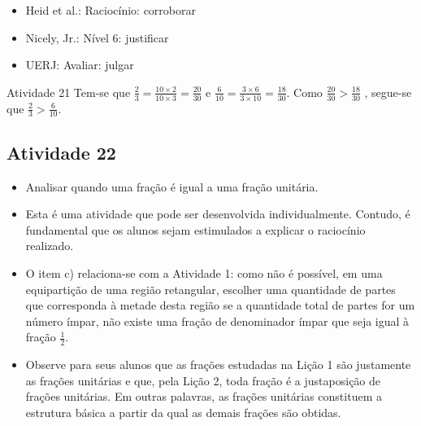    \vspace{.1cm}

 \vspace{.1cm}

\begin{itemize} %
    \item       Heid et al.: Raciocínio: corroborar
    \item       Nicely, Jr.: Nível 6: justificar
    \item       UERJ: Avaliar: julgar
\end{itemize} %

\begin{resposta*}{Atividade 21}
  Tem-se que   $\frac{2}{3} = \frac{10 \times 2}{10 \times 3} = \frac{20}{30}$
e
  $\frac{6}{10} = \frac{3 \times 6}{3 \times 10} = \frac{18}{30}$.
  Como   $\frac{20}{30} > \frac{18}{30}$  , segue-se que   $\frac{2}{3} >
\frac{6}{10}$.
\end{resposta*}

\subsection{Atividade 22}

\begin{itemize} %
    \item       Analisar quando uma fração é igual a uma fração unitária.
\end{itemize} %



\begin{itemize} %
    \item       Esta é uma atividade que pode ser desenvolvida individualmente.
Contudo, é fundamental que os alunos sejam estimulados a explicar o raciocínio
realizado.
    \item       O item c) relaciona-se com a Atividade 1: como não é possível,
em uma equipartição de uma região retangular, escolher uma quantidade de partes
que corresponda à metade desta região se a quantidade total de partes for um
número ímpar, não existe uma fração de denominador ímpar que seja igual à fração
      $\frac{1}{2}$.
    \item       Observe para seus alunos que as frações estudadas na Lição 1 são
justamente as frações unitárias e que, pela Lição 2, toda fração é a
justaposição de frações unitárias. Em outras palavras, as frações unitárias
constituem a estrutura básica a partir da qual as demais frações são obtidas.
\end{itemize} %


